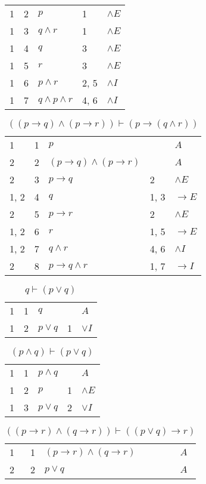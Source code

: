 \documentclass{article}
\begin{document}
\begin{table}[htbp]
\begin{tabular}{lrlll}
{1} & 2 & $p$ & {1} & $∧E$ \\
{1} & 3 & $q∧r$ & {1} & $∧E$ \\
{1} & 4 & $q$ & {3} & $∧E$ \\
{1} & 5 & $r$ & {3} & $∧E$ \\
{1} & 6 & $p∧r$ & {2, 5} & $∧I$ \\
{1} & 7 & $q∧p∧r$ & {4, 6} & $∧I$ \\
\end{tabular}
\end{table}\begin{table}[htbp]\caption*{$((p→q)∧(p→r)) ⊢ (p→(q∧r))$}\centering\begin{tabular}{lrlll}
{1} & 1 & $p$ & {} & $A$ \\
{2} & 2 & $(p→q)∧(p→r)$ & {} & $A$ \\
{2} & 3 & $p→q$ & {2} & $∧E$ \\
{1, 2} & 4 & $q$ & {1, 3} & $→E$ \\
{2} & 5 & $p→r$ & {2} & $∧E$ \\
{1, 2} & 6 & $r$ & {1, 5} & $→E$ \\
{1, 2} & 7 & $q∧r$ & {4, 6} & $∧I$ \\
{2} & 8 & $p→q∧r$ & {1, 7} & $→I$ \\
\end{tabular}
\end{table}\begin{table}[htbp]\caption*{$q ⊢ (p∨q)$}\centering\begin{tabular}{lrlll}
{1} & 1 & $q$ & {} & $A$ \\
{1} & 2 & $p∨q$ & {1} & $∨I$ \\
\end{tabular}
\end{table}\begin{table}[htbp]\caption*{$(p∧q) ⊢ (p∨q)$}\centering\begin{tabular}{lrlll}
{1} & 1 & $p∧q$ & {} & $A$ \\
{1} & 2 & $p$ & {1} & $∧E$ \\
{1} & 3 & $p∨q$ & {2} & $∨I$ \\
\end{tabular}
\end{table}\begin{table}[htbp]\caption*{$((p→r)∧(q→r)) ⊢ ((p∨q)→r)$}\centering\begin{tabular}{lrlll}
{1} & 1 & $(p→r)∧(q→r)$ & {} & $A$ \\
{2} & 2 & $p∨q$ & {} & $A$ \\

\end{tabular}
\end{table}
\end{document}
